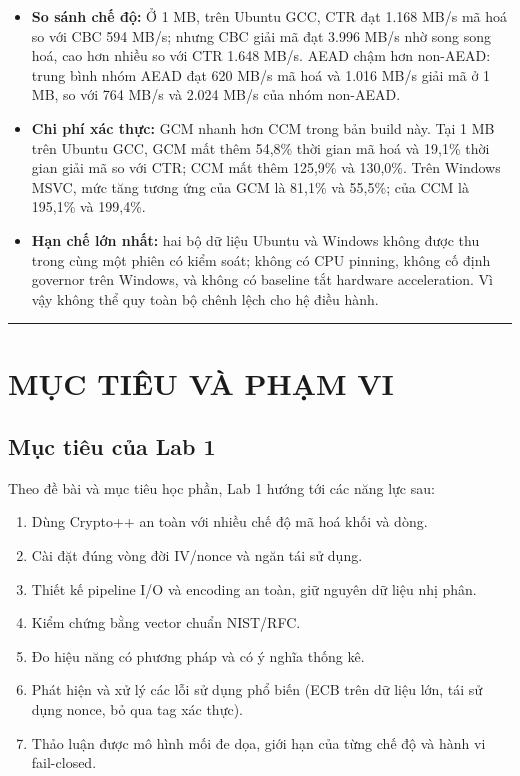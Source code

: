 \documentclass[12pt,a4paper,oneside]{report}
\begin{document}
\begin{itemize}[leftmargin=*]
\item \textbf{So sánh chế độ:} Ở 1 MB, trên Ubuntu GCC, CTR đạt 1.168 MB/s mã hoá so với CBC 594 MB/s; nhưng CBC giải mã đạt 3.996 MB/s nhờ song song hoá, cao hơn nhiều so với CTR 1.648 MB/s. AEAD chậm hơn non-AEAD: trung bình nhóm AEAD đạt 620 MB/s mã hoá và 1.016 MB/s giải mã ở 1 MB, so với 764 MB/s và 2.024 MB/s của nhóm non-AEAD.
\item \textbf{Chi phí xác thực:} GCM nhanh hơn CCM trong bản build này. Tại 1 MB trên Ubuntu GCC, GCM mất thêm 54,8\% thời gian mã hoá và 19,1\% thời gian giải mã so với CTR; CCM mất thêm 125,9\% và 130,0\%. Trên Windows MSVC, mức tăng tương ứng của GCM là 81,1\% và 55,5\%; của CCM là 195,1\% và 199,4\%.
\item \textbf{Hạn chế lớn nhất:} hai bộ dữ liệu Ubuntu và Windows không được thu trong cùng một phiên có kiểm soát; không có CPU pinning, không cố định governor trên Windows, và không có baseline tắt hardware acceleration. Vì vậy không thể quy toàn bộ chênh lệch cho hệ điều hành.
\end{itemize}


\par\noindent\rule{\textwidth}{0.4pt}


\chapter{MỤC TIÊU VÀ PHẠM VI}


\section{Mục tiêu của Lab 1}


Theo đề bài và mục tiêu học phần, Lab 1 hướng tới các năng lực sau:


\begin{enumerate}[leftmargin=*]
\item Dùng Crypto++ an toàn với nhiều chế độ mã hoá khối và dòng.
\item Cài đặt đúng vòng đời IV/nonce và ngăn tái sử dụng.
\item Thiết kế pipeline I/O và encoding an toàn, giữ nguyên dữ liệu nhị phân.
\item Kiểm chứng bằng vector chuẩn NIST/RFC.
\item Đo hiệu năng có phương pháp và có ý nghĩa thống kê.
\item Phát hiện và xử lý các lỗi sử dụng phổ biến (ECB trên dữ liệu lớn, tái sử dụng nonce, bỏ qua tag xác thực).
\item Thảo luận được mô hình mối đe dọa, giới hạn của từng chế độ và hành vi fail-closed.
\end{enumerate}
\end{document}
